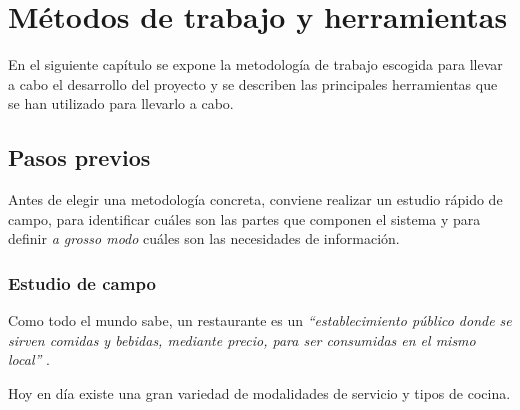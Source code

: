 
\chapter{Métodos de trabajo y herramientas}
En el siguiente capítulo se expone la metodología de trabajo escogida para
llevar a cabo el desarrollo del proyecto y se describen las principales 
herramientas que se han utilizado para llevarlo a cabo.

\section{Pasos previos}
Antes de elegir una metodología concreta, conviene realizar un estudio rápido
de campo, para identificar cuáles son las partes que componen el sistema y para
definir \emph{a grosso modo} cuáles son las necesidades de información.

  \subsection{Estudio de campo}
Como todo el mundo sabe, un restaurante es un \emph{``establecimiento público 
donde se sirven comidas y bebidas, mediante precio, para ser consumidas en el
mismo local''} \cite{bib:rae}.

Hoy en día existe una gran variedad de modalidades de servicio y tipos de
cocina.

